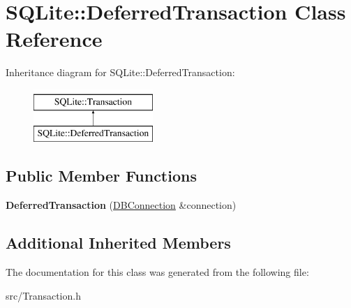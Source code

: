 \hypertarget{class_s_q_lite_1_1_deferred_transaction}{\section{S\-Q\-Lite\-:\-:Deferred\-Transaction Class Reference}
\label{class_s_q_lite_1_1_deferred_transaction}
}
Inheritance diagram for S\-Q\-Lite\-:\-:Deferred\-Transaction\-:\begin{figure}[H]
\begin{center}
\leavevmode
\includegraphics[height=2.000000cm]{class_s_q_lite_1_1_deferred_transaction}
\end{center}
\end{figure}
\subsection*{Public Member Functions}
\begin{DoxyCompactItemize}
\item 
\hypertarget{class_s_q_lite_1_1_deferred_transaction_ae1b880ce4c3796565b6ea4d492f61202}{{\bfseries Deferred\-Transaction} (\hyperlink{class_s_q_lite_1_1_d_b_connection}{D\-B\-Connection} \&connection)}\label{class_s_q_lite_1_1_deferred_transaction_ae1b880ce4c3796565b6ea4d492f61202}

\end{DoxyCompactItemize}
\subsection*{Additional Inherited Members}


The documentation for this class was generated from the following file\-:\begin{DoxyCompactItemize}
\item 
src/Transaction.\-h\end{DoxyCompactItemize}
